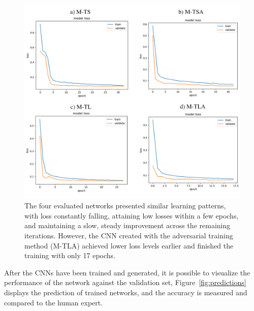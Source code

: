 \documentclass[12pt]{article}
\begin{document}
\begin{figure} [H]
\begin{center}
\includegraphics[width=1.0\textwidth]{figures/epochs.png}
\caption{ The four evaluated networks presented similar learning patterns, with loss constantly falling, attaining low losses within a few epochs, and maintaining a slow, steady improvement across the remaining iterations. However, the CNN created with the adversarial training method (M-TLA) achieved lower loss levels earlier and finished the training with only 17 epochs.  }
\label{fig:epochs}
\end{center}
\end{figure}

After the CNNs have been trained and generated, it is possible to visualize the performance of the network against the validation set, Figure~\ref{fig:predictions} displays the prediction of trained networks, and the accuracy is measured and compared to the human expert.
\end{document}
